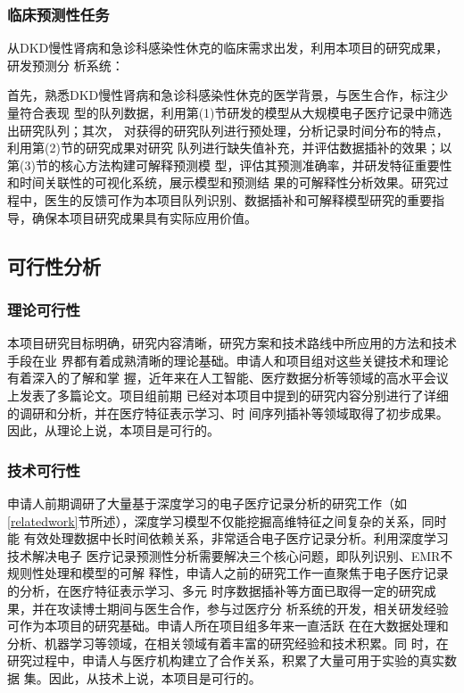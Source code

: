 \subsubsection{临床预测性任务}

从DKD慢性肾病和急诊科感染性休克的临床需求出发，利用本项目的研究成果，研发预测分
析系统：

首先，熟悉DKD慢性肾病和急诊科感染性休克的医学背景，与医生合作，标注少量符合表现
型的队列数据，利用第(1)节研发的模型从大规模电子医疗记录中筛选出研究队列；其次，
对获得的研究队列进行预处理，分析记录时间分布的特点，利用第(2)节的研究成果对研究
队列进行缺失值补充，并评估数据插补的效果；以第(3)节的核心方法构建可解释预测模
型，评估其预测准确率，并研发特征重要性和时间关联性的可视化系统，展示模型和预测结
果的可解释性分析效果。研究过程中，医生的反馈可作为本项目队列识别、数据插补和可解释模型研究的重要指导，确保本项目研究成果具有实际应用价值。

\subsection{可行性分析}

\subsubsection{理论可行性}

本项目研究目标明确，研究内容清晰，研究方案和技术路线中所应用的方法和技术手段在业
界都有着成熟清晰的理论基础。申请人和项目组对这些关键技术和理论有着深入的了解和掌
握，近年来在人工智能、医疗数据分析等领域的高水平会议上发表了多篇论文。项目组前期
已经对本项目中提到的研究内容分别进行了详细的调研和分析，并在医疗特征表示学习、时
间序列插补等领域取得了初步成果。因此，从理论上说，本项目是可行的。

\subsubsection{技术可行性}

申请人前期调研了大量基于深度学习的电子医疗记录分析的研究工作（如
\ref{relatedwork}节所述），深度学习模型不仅能挖掘高维特征之间复杂的关系，同时能
有效处理数据中长时间依赖关系，非常适合电子医疗记录分析。利用深度学习技术解决电子
医疗记录预测性分析需要解决三个核心问题，即队列识别、EMR不规则性处理和模型的可解
释性，申请人之前的研究工作一直聚焦于电子医疗记录的分析，在医疗特征表示学习、多元
时序数据插补等方面已取得一定的研究成果，并在攻读博士期间与医生合作，参与过医疗分
析系统的开发，相关研发经验可作为本项目的研究基础。申请人所在项目组多年来一直活跃
在在大数据处理和分析、机器学习等领域，在相关领域有着丰富的研究经验和技术积累。同
时，在研究过程中，申请人与医疗机构建立了合作关系，积累了大量可用于实验的真实数据
集。因此，从技术上说，本项目是可行的。

